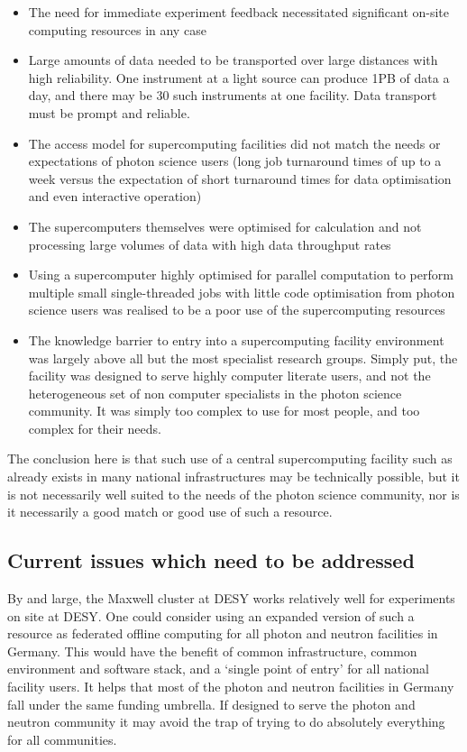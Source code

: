\begin{itemize}
\item The need for immediate experiment feedback necessitated significant on-site computing resources in any case
\item Large amounts of data needed to be transported over large distances with high reliability.  One instrument at a light source can produce 1PB of data a day, and there may be 30 such instruments at one facility.  Data transport must be prompt and reliable.
\item The access model for supercomputing facilities did not match the needs or expectations of photon science users (long job turnaround times of up to a week versus the expectation of short turnaround times for data optimisation and even interactive operation)
\item The supercomputers themselves were optimised for calculation and not processing large volumes of data with high data throughput rates
\item Using a supercomputer highly optimised for parallel computation to perform multiple small single-threaded jobs with little code optimisation from photon science users was realised to be a poor use of the supercomputing resources
\item The knowledge barrier to entry into a supercomputing facility environment was largely above all but the most specialist research groups.  Simply put, the facility was designed to serve highly computer literate users, and not the heterogeneous set of non computer specialists in the photon science community.  It was simply too complex to use for most people, and too complex for their needs. 
\end{itemize}

The conclusion here is that such use of a central supercomputing
facility such as already exists in many national infrastructures may be
technically possible, but it is not necessarily well suited to the needs
of the photon science community, nor is it necessarily a good match or
good use of such a resource.

\subsection{Current issues which need to be addressed}

By and large, the Maxwell cluster at DESY works relatively well for
experiments on site at DESY.  One could consider using an expanded
version of such a resource as federated offline computing for all photon
and neutron facilities in Germany.  This would have the benefit of
common infrastructure, common environment and software stack, and a
‘single point of entry’ for all national facility users.  It helps that
most of the photon and neutron facilities in Germany fall under the same
funding umbrella.  If designed to serve the photon and neutron community
it may avoid the trap of trying to do absolutely everything for all
communities.

